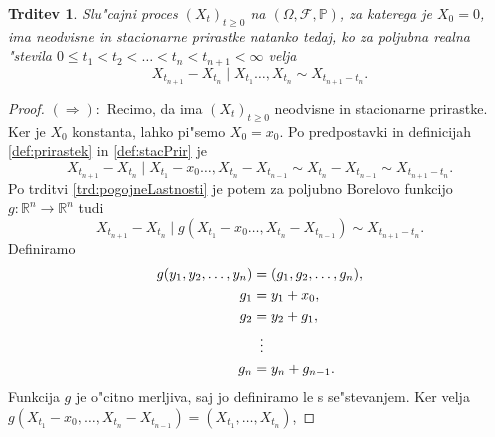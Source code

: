 \documentclass[12pt, a4paper, reqno]{amsart}
\theoremstyle{definition}
\theoremstyle{plain}
\newtheorem{trditev}[definicija]{Trditev}
\newcommand{\R}{\mathbb{R}}
\newcommand{\F}{\mathcal{F}}
\newcommand{\1}{\mathds{1}}
\newcommand*{\refPriloga}[1]{%
  \begingroup
    \hypersetup{
      linkcolor=red,
      linkbordercolor=red,
    }%
    \ref{#1}%
  \endgroup
}
\begin{document}
        \pagebreak
        \begin{trditev}
            Slu"cajni proces $(X_t)_{t\geq0}$ na $(\Omega, \F, \mathbb{P})$, za katerega je $X_0 = 0$, ima
            neodvisne in stacionarne prirastke natanko tedaj, ko za poljubna realna "stevila
            $0\leq t_1 < t_2 < \ldots < t_n < t_{n+1} < \infty$ velja 
            \begin{equation}
                X_{t_{n+1}} - X_{t_n}\mid X_{t_1} \dots, X_{t_n} \sim X_{t_{n+1} - t_n}.
                \label{eq:neodvisnostStacionarnostPrirastov}
            \end{equation}
            \label{trd:neodvisnostStacionarnostPrirastov}
        \end{trditev}

        \begin{proof}
            $(\Rightarrow):$ Recimo, da ima $(X_t)_{t\geq0}$ neodvisne in stacionarne prirastke. Ker je 
            $X_0$ konstanta, lahko pi"semo $X_0 = x_0$. Po predpostavki in definicijah \refPriloga{def:prirastek} in 
            \refPriloga{def:stacPrir} je 
            \begin{equation*}
                X_{t_{n+1}} - X_{t_n}\mid X_{t_1} - x_0 \dots, X_{t_n} - X_{t_{n-1}}\sim X_{t_n} - X_{t_{n-1}} \sim X_{t_{n+1} - t_n}.
            \end{equation*}
            Po trditvi \refPriloga{trd:pogojneLastnosti} je potem za poljubno Borelovo funkcijo $g:\R^{n}\to \R^{n}$
            tudi 
            \begin{equation*}
                X_{t_{n+1}} - X_{t_n}\mid g(X_{t_1} - x_0 \dots, X_{t_n} - X_{t_{n-1}}) \sim X_{t_{n+1} - t_n}.
            \end{equation*}
            Definiramo 
            \begin{align*}
                g(y_1, y_2, \dots, y_n) &= (g_1, g_2, \dots, g_n),\\
                                    g_1 &= y_1 + x_0, \\
                                    g_2 &= y_2 + g_1, \\
                                    &\mathrel{\makebox[\widthof{=}]{\vdots}} \\
                                    g_n &= y_n + g_{n-1}.
            \end{align*}
            Funkcija $g$ je o"citno merljiva, saj jo definiramo le s se"stevanjem. Ker velja
            $g(X_{t_1} - x_0, \dots, X_{t_n} - X_{t_{n-1}}) = (X_{t_1}, \dots, X_{t_n})$, 

\end{proof}
\end{document}
